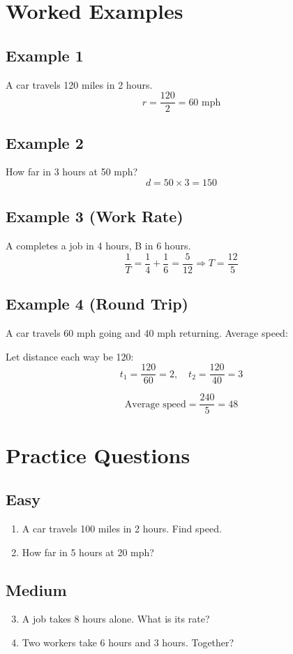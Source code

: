 \section*{Worked Examples}

\subsection*{Example 1}
A car travels 120 miles in 2 hours.
\[
r = \frac{120}{2} = 60 \text{ mph}
\]

\subsection*{Example 2}
How far in 3 hours at 50 mph?
\[
d = 50 \times 3 = 150
\]

\subsection*{Example 3 (Work Rate)}
A completes a job in 4 hours, B in 6 hours.
\[
\frac{1}{T} = \frac{1}{4} + \frac{1}{6} = \frac{5}{12}
\Rightarrow T = \frac{12}{5}
\]

\subsection*{Example 4 (Round Trip)}
A car travels 60 mph going and 40 mph returning. Average speed:

Let distance each way be 120:
\[
t_1 = \frac{120}{60} = 2, \quad t_2 = \frac{120}{40} = 3
\]

\[
\text{Average speed} = \frac{240}{5} = 48
\]

\section*{Practice Questions}

\subsection*{Easy}
\begin{enumerate}
    \item A car travels 100 miles in 2 hours. Find speed.
    \item How far in 5 hours at 20 mph?
\end{enumerate}

\subsection*{Medium}
\begin{enumerate}
    \setcounter{enumi}{2}
    \item A job takes 8 hours alone. What is its rate?
    \item Two workers take 6 hours and 3 hours. Together?
\end{enumerate}

